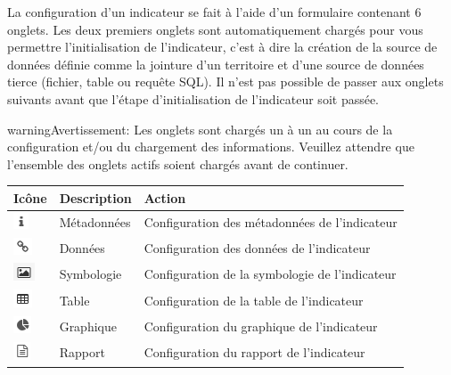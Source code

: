\documentclass[letterpaper,10pt,french]{sphinxmanual}
\begin{document}
\begin{center}\setlength{\fboxsep}{5pt}\end{center}

La configuration d'un indicateur se fait à l'aide d'un formulaire
contenant 6 onglets.  Les deux premiers onglets sont automatiquement
chargés pour vous permettre l'initialisation de l'indicateur, c'est à
dire la création de la source de données définie comme la jointure
d'un territoire et d'une source de données tierce (fichier, table ou
requête SQL). Il n'est pas possible de passer aux onglets suivants
avant que l'étape d'initialisation de l'indicateur soit passée.

\begin{notice}{warning}{Avertissement:}
Les onglets sont chargés un à un au cours de la configuration et/ou
du chargement des informations. Veuillez attendre que l'ensemble
des onglets actifs soient chargés avant de continuer.
\end{notice}

\begin{tabulary}{\linewidth}{|L|L|L|}
\hline

\textbf{Icône}
 & 
\textbf{Description}
 & 
\textbf{Action}
\\
\hline
\includegraphics{info1.png}
 & 
Métadonnées
 & 
Configuration des métadonnées de l'indicateur
\\
\hline
\includegraphics{link.png}
 & 
Données
 & 
Configuration des données de l'indicateur
\\
\hline
\includegraphics{data-raster-icon1.png}
 & 
Symbologie
 & 
Configuration de la symbologie de l'indicateur
\\
\hline
\includegraphics{table.png}
 & 
Table
 & 
Configuration de la table de l'indicateur
\\
\hline
\includegraphics{chart.png}
 & 
Graphique
 & 
Configuration du graphique de l'indicateur
\\
\hline
\includegraphics{report.png}
 & 
Rapport
 & 
Configuration du rapport de l'indicateur
\\
\hline\end{tabulary}
\end{document}
